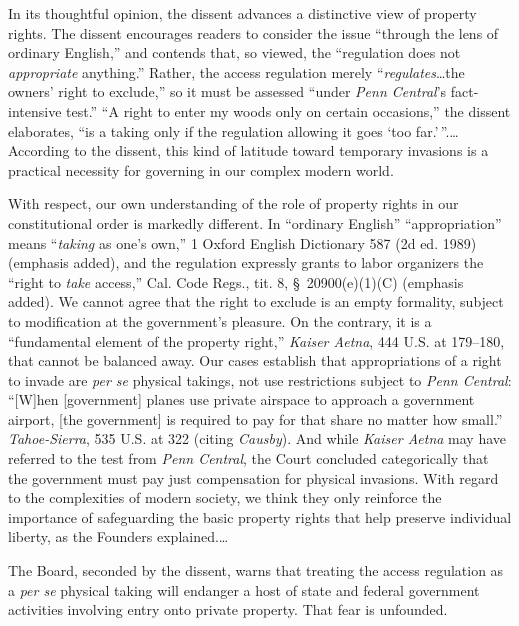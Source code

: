 In its thoughtful opinion, the dissent advances a distinctive view of property
rights. The dissent encourages readers to consider the issue ``through the lens
of ordinary English,'' and contends that, so viewed, the ``regulation does not
\textit{appropriate} anything.'' Rather, the access regulation merely
``\textit{regulates}\ldots the owners' right to exclude,'' so it must be
assessed ``under \textit{Penn Central}'s fact-intensive test.'' ``A right to
enter my woods only on certain occasions,'' the dissent elaborates, ``is a
taking only if the regulation allowing it goes `too far.'\,''.\ldots According
to the dissent, this kind of latitude toward temporary invasions is a practical
necessity for governing in our complex modern world.


With respect, our own understanding of the role of property rights in our
constitutional order is markedly different. In ``ordinary English''
``appropriation'' means ``\textit{taking} as one's own,'' 1 Oxford English
Dictionary 587 (2d ed. 1989) (emphasis added), and the regulation expressly
grants to labor organizers the ``right to \textit{take} access,'' Cal. Code
Regs., tit. 8, \S~20900(e)(1)(C) (emphasis added). We cannot agree that the
right to exclude is an empty formality, subject to modification at the
government's pleasure. On the contrary, it is a ``fundamental element of the
property right,'' \textit{Kaiser Aetna}, 444 U.S. at 179--180, that cannot be
balanced away. Our cases establish that appropriations of a right to invade are
\textit{per se} physical takings, not use restrictions subject to \textit{Penn
Central}: ``[W]hen [government] planes use private airspace to approach a
government airport, [the government] is required to pay for that share no matter
how small.'' \textit{Tahoe-Sierra}, 535 U.S. at 322 (citing \textit{Causby}).
And while \textit{Kaiser Aetna} may have referred to the test from \textit{Penn
Central}, the Court concluded categorically that the government must pay just
compensation for physical invasions. With regard to the complexities of modern
society, we think they only reinforce the importance of safeguarding the basic
property rights that help preserve individual liberty, as the Founders
explained.\ldots



The Board, seconded by the dissent, warns that treating the access regulation as
a \textit{per se} physical taking will endanger a host of state and federal
government activities involving entry onto private property. That fear is
unfounded.


